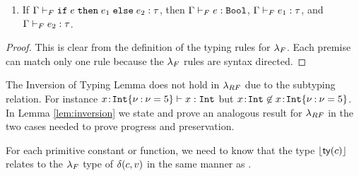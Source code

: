 \begin{fullversion}
\begin{lemma}
\begin{enumerate}
        \item If ${\mathrm{\Gamma}} \vdash_F {{{\texttt{if}}}\;{e}\;{{\texttt{then}}}\;{e_1}\;{{\texttt{else}}}\;{e_2}} : {\tau}$, then
            ${\mathrm{\Gamma}} \vdash_F {e} : {\texttt{Bool}}$,
            ${\mathrm{\Gamma}} \vdash_F {e_1} : {\tau}$, and 
            ${\mathrm{\Gamma}} \vdash_F {e_2} : {\tau}$.
    \end{enumerate}
\end{lemma}
\begin{proof}
This is clear from the definition of the typing rules for $\lambda_{F}$. Each premise
can match only one rule because the $\lambda_{F}$ rules are syntax directed.
\end{proof}
The Inversion of Typing Lemma does not hold in $\lambda_{RF}$ due to the subtyping
relation. For instance 
${{{x}\!:\!{{{\texttt{Int}}\{\nu \mathbin{:} \nu = 5\}}}}} \vdash {x} : {\texttt{Int}}$ but
${{x}\!:\!{\texttt{Int}}} \not \in {\ensuremath{{{x}\!:\!{{{\texttt{Int}}\{\nu \mathbin{:} \nu = 5\}}}}}}$.
In Lemma \ref{lem:inversion} we state and prove an analogous result 
for $\lambda_{RF}$ in the two cases needed to prove progress and preservation.

%
For each primitive constant or function, we need 
to know that the type $\lfloor{{\mathsf{ty}}(\ensuremath{c})}\rfloor$ 
relates to the $\lambda_{F}$ type of $\delta(c,v)$ 
in the same manner as \fApp.
%


\end{fullversion}
